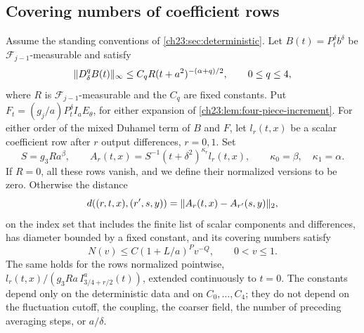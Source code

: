 \subsection{Covering numbers of coefficient rows}

\begin{lemma}\label{ch23:lem:coefficient-cover}
Assume the standing conventions of \cref{ch23:sec:deterministic}. Let $B(t)=P_t^\delta b^\delta$ be $\mathcal F_{j-1}$-measurable and satisfy
\[
 \lVert D_\delta^qB(t)\rVert_\infty\le C_qR(t+a^2)^{-(\alpha+q)/2},\qquad 0\le q\le4,
\]
where $R$ is $\mathcal F_{j-1}$-measurable and the $C_q$ are fixed constants. Put $F_t=(g_j/a)P_t^\delta I_aE_\theta$, for either expansion of \cref{ch23:lem:four-piece-increment}. For either order of the mixed Duhamel term of $B$ and $F$, let $l_r(t,x)$ be a scalar coefficient row after $r$ output differences, $r=0,1$. Set
\[
 S=g_3Ra^\beta,\qquad
 A_r(t,x)=S^{-1}(t+\delta^2)^{\kappa_r}l_r(t,x),\qquad \kappa_0=\beta,\quad\kappa_1=\alpha.
\]
If $R=0$, all these rows vanish, and we define their normalized versions to be zero. Otherwise the distance
\[
 d((r,t,x),(r',s,y))=\lVert A_r(t,x)-A_{r'}(s,y)\rVert_2,
\]
on the index set that includes the finite list of scalar components and differences, has diameter bounded by a fixed constant, and its covering numbers satisfy
\begin{equation}\label{ch23:eq:normalized-cover}
 N(v)\le C(1+L/a)^Pv^{-Q},\qquad 0<v\le1.
\end{equation}
The same holds for the rows normalized pointwise, $l_r(t,x)/(g_3Ra\,I_{3/4+r/2}^a(t))$, extended continuously to $t=0$. The constants depend only on the deterministic data and on $C_0,\dots,C_4$; they do not depend on the fluctuation cutoff, the coupling, the coarser field, the number of preceding averaging steps, or $a/\delta$.
\end{lemma}


